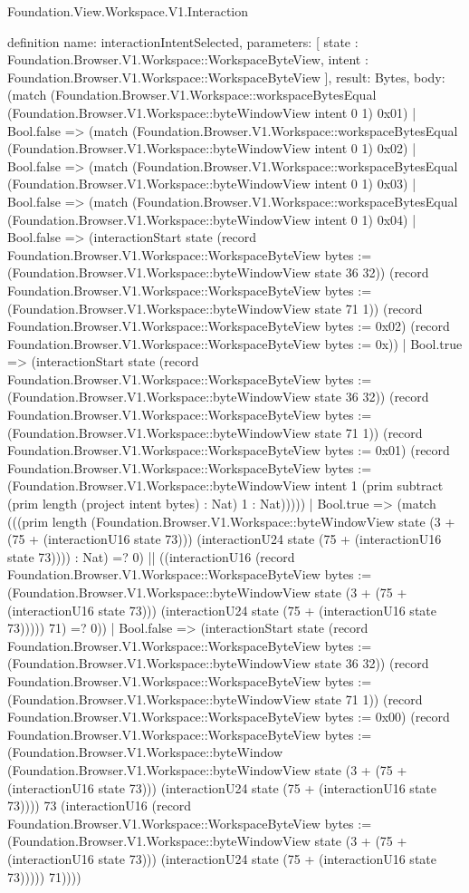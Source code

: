 \begin{lexlean}{Foundation.View.Workspace.V1.Interaction}
\begin{semanticmodule}
definition{
  name: interactionIntentSelected,
  parameters: [
    state : Foundation.Browser.V1.Workspace::WorkspaceByteView,
    intent : Foundation.Browser.V1.Workspace::WorkspaceByteView
  ],
  result: Bytes,
  body: (match (Foundation.Browser.V1.Workspace::workspaceBytesEqual (Foundation.Browser.V1.Workspace::byteWindowView intent 0 1) 0x01)
    | Bool.false => (match (Foundation.Browser.V1.Workspace::workspaceBytesEqual (Foundation.Browser.V1.Workspace::byteWindowView intent 0 1) 0x02)
      | Bool.false => (match (Foundation.Browser.V1.Workspace::workspaceBytesEqual (Foundation.Browser.V1.Workspace::byteWindowView intent 0 1) 0x03)
        | Bool.false => (match (Foundation.Browser.V1.Workspace::workspaceBytesEqual (Foundation.Browser.V1.Workspace::byteWindowView intent 0 1) 0x04)
          | Bool.false => (interactionStart state (record Foundation.Browser.V1.Workspace::WorkspaceByteView {bytes := (Foundation.Browser.V1.Workspace::byteWindowView state 36 32)}) (record Foundation.Browser.V1.Workspace::WorkspaceByteView {bytes := (Foundation.Browser.V1.Workspace::byteWindowView state 71 1)}) (record Foundation.Browser.V1.Workspace::WorkspaceByteView {bytes := 0x02}) (record Foundation.Browser.V1.Workspace::WorkspaceByteView {bytes := 0x}))
          | Bool.true => (interactionStart state (record Foundation.Browser.V1.Workspace::WorkspaceByteView {bytes := (Foundation.Browser.V1.Workspace::byteWindowView state 36 32)}) (record Foundation.Browser.V1.Workspace::WorkspaceByteView {bytes := (Foundation.Browser.V1.Workspace::byteWindowView state 71 1)}) (record Foundation.Browser.V1.Workspace::WorkspaceByteView {bytes := 0x01}) (record Foundation.Browser.V1.Workspace::WorkspaceByteView {bytes := (Foundation.Browser.V1.Workspace::byteWindowView intent 1 (prim subtract (prim length (project intent bytes) : Nat) 1 : Nat))})))
        | Bool.true => (match (((prim length (Foundation.Browser.V1.Workspace::byteWindowView state (3 + (75 + (interactionU16 state 73))) (interactionU24 state (75 + (interactionU16 state 73)))) : Nat) =? 0) || ((interactionU16 (record Foundation.Browser.V1.Workspace::WorkspaceByteView {bytes := (Foundation.Browser.V1.Workspace::byteWindowView state (3 + (75 + (interactionU16 state 73))) (interactionU24 state (75 + (interactionU16 state 73))))}) 71) =? 0))
          | Bool.false => (interactionStart state (record Foundation.Browser.V1.Workspace::WorkspaceByteView {bytes := (Foundation.Browser.V1.Workspace::byteWindowView state 36 32)}) (record Foundation.Browser.V1.Workspace::WorkspaceByteView {bytes := (Foundation.Browser.V1.Workspace::byteWindowView state 71 1)}) (record Foundation.Browser.V1.Workspace::WorkspaceByteView {bytes := 0x00}) (record Foundation.Browser.V1.Workspace::WorkspaceByteView {bytes := (Foundation.Browser.V1.Workspace::byteWindow (Foundation.Browser.V1.Workspace::byteWindowView state (3 + (75 + (interactionU16 state 73))) (interactionU24 state (75 + (interactionU16 state 73)))) 73 (interactionU16 (record Foundation.Browser.V1.Workspace::WorkspaceByteView {bytes := (Foundation.Browser.V1.Workspace::byteWindowView state (3 + (75 + (interactionU16 state 73))) (interactionU24 state (75 + (interactionU16 state 73))))}) 71))}))
}
\end{semanticmodule}
\end{lexlean}
